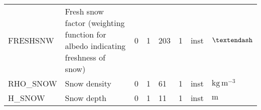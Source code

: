\begin{longtable}{p{2.0cm}p{5.0cm}p{0.8cm}p{0.8cm}p{0.8cm}p{0.9cm}p{1cm}p{1cm}}
FRESHSNW                       &  Fresh snow factor (weighting function for albedo indicating freshness of snow)        &               0                                   &                     1                       &                   203                      &                 1                           &                      inst                   &        $\mathrm{\textendash}$  \\
RHO\_SNOW                      &  Snow density                                                                          &               0                                   &                     1                       &                    61                      &                 1                           &                      inst                   &        $\mathrm{kg\,m^{-3}}$  \\
H\_SNOW                        &  Snow depth                                                                            &               0                                   &                     1                       &                    11                      &                 1                           &                      inst                   &        $\mathrm{m}$  \\
  \bottomrule
\end{longtable}




